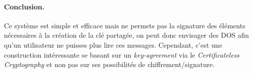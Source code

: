 \paragraph*{Conclusion.} Ce système est simple et efficace mais ne permets pas la signature des éléments nécessaires à la création de la clé partagée, on peut donc envisager des DOS afin qu'un utilisateur ne puisses plus lire ces messages. Cependant, c'est une construction intéressante se basant sur un \textit{key-agreement} via le \textit{Certificateless Cryptography} et non pas sur ses possibilités de chiffrement/signature.



